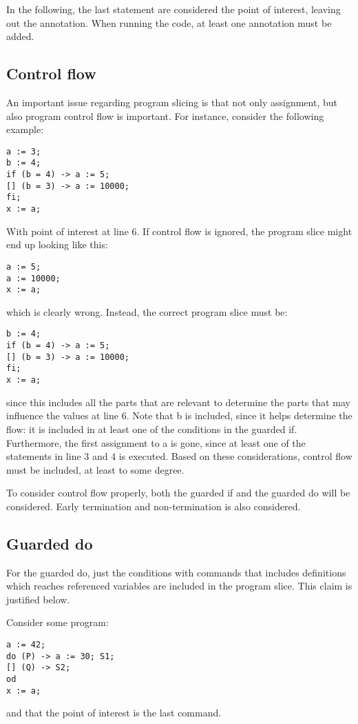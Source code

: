 In the following, the last statement are considered the point of interest,
leaving out the annotation. When running the code, at least one annotation must be added.

\subsection{Control flow}

An important issue regarding program slicing is that not only assignment, but also program control
flow is important. For instance, consider the following example:
\begin{lstlisting}
a := 3;
b := 4;
if (b = 4) -> a := 5;
[] (b = 3) -> a := 10000;
fi;
x := a;
\end{lstlisting}
With point of interest at line 6.
If control flow is ignored, the program slice might end up looking like this:
\begin{lstlisting}
a := 5;
a := 10000;
x := a;
\end{lstlisting}
which is clearly wrong. Instead, the correct program slice must be:
\begin{lstlisting}
b := 4;
if (b = 4) -> a := 5;
[] (b = 3) -> a := 10000;
fi;
x := a;
\end{lstlisting}
since this includes all the parts that are relevant to determine the parts
that may influence the values at line 6.
Note that b is included, since it helps determine the flow: it is included in at least one of the
conditions in the guarded if. Furthermore, the first assignment to a is gone, since at least one of the
statements in line 3 and 4 is executed.
Based on these considerations, control flow must be included, at least to some degree.

To consider control flow properly, both the guarded if and the guarded do will be considered. Early
termination and non-termination is also considered.

\subsection{Guarded do}

For the guarded do, just the conditions with commands that includes definitions which reaches
referenced variables are included in the program slice. This claim is justified below.

Consider some program:
\begin{lstlisting}
a := 42;
do (P) -> a := 30; S1;
[] (Q) -> S2;
od
x := a;
\end{lstlisting}
and that the point of interest is the last command.


